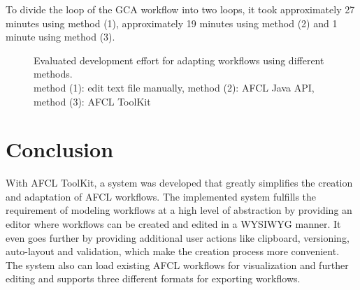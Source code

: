 \documentclass[a4paper,top=25mm,bottom=25mm,12pt,pdftex,halfparskip,twoside,bibtotoc,numbers=noenddot]{scrbook}
\begin{document}

To divide the loop of the GCA workflow into two loops, it took approximately 27 minutes using method (1), approximately 19 minutes using method (2) and 1 minute using method (3).

\begin{figure}[h]
\caption{Evaluated development effort for adapting workflows using different methods.\\ \small{method (1): edit text file manually, method (2): AFCL Java API, method (3): AFCL ToolKit}}
\label{fig:evaluation-adaptation}
\end{figure}



\chapter{Conclusion}

With AFCL ToolKit, a system was developed that greatly simplifies the creation and adaptation of AFCL workflows. 
The implemented system fulfills the requirement of modeling workflows at a high level of abstraction by providing an editor where workflows can be created and edited in a WYSIWYG manner. It even goes further by providing additional user actions like clipboard, versioning, auto-layout and validation, which make the creation process more convenient.
The system also can load existing AFCL workflows for visualization and further editing and supports three different formats for exporting workflows.
\end{document}
